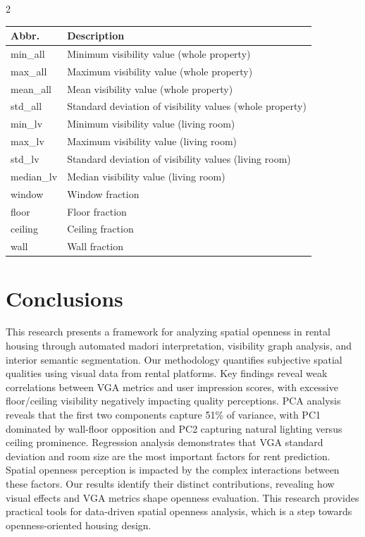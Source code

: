 \documentclass[11pt,a4paper]{article}
\begin{document}
\begin{multicols}{2}
\begin{center}
\begin{tabular}{l|l}
\hline
\textbf{Abbr.} & \textbf{Description} \\
\hline
min\_all & Minimum visibility value (whole property) \\
max\_all & Maximum visibility value (whole property) \\
mean\_all & Mean visibility value (whole property) \\
std\_all & Standard deviation of visibility values (whole property) \\
min\_lv & Minimum visibility value (living room) \\
max\_lv & Maximum visibility value (living room) \\
std\_lv & Standard deviation of visibility values (living room) \\
median\_lv & Median visibility value (living room) \\
window & Window fraction \\
floor & Floor fraction \\
ceiling & Ceiling fraction \\
wall & Wall fraction \\
\hline
\end{tabular}
\label{tab:feature_abbreviations}
\end{center}





\vspace{1em}

\section{Conclusions}

This research presents a framework for analyzing spatial openness in rental housing through automated madori
interpretation, visibility graph analysis, and interior semantic segmentation. Our methodology quantifies subjective 
spatial qualities using visual data from rental platforms. Key findings reveal weak correlations between VGA metrics 
and user impression scores, with excessive floor/ceiling visibility negatively impacting quality perceptions. 
PCA analysis reveals that the first two components capture 51\% of variance, with PC1 dominated by wall-floor 
opposition and PC2 capturing natural lighting versus ceiling prominence. Regression analysis demonstrates that VGA 
standard deviation and room size are the most important factors for rent prediction. Spatial openness perception is 
impacted by the complex interactions between these factors. Our results identify their distinct contributions, 
revealing how visual effects and VGA metrics shape openness evaluation. This research provides practical tools for 
data-driven spatial openness analysis, which is a step towards openness-oriented housing design.


\end{multicols}
\end{document}
